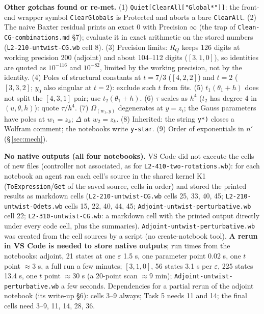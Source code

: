 \documentclass[10pt]{article}
\newcommand{\nb}[1]{\texttt{#1}}
\begin{document}
\textbf{Other gotchas found or re-met.} (1) \nb{Quiet[ClearAll["Global\textasciigrave{}*"]]}: the front-end wrapper symbol \nb{ClearGlobals} is Protected and aborts a bare \nb{ClearAll}. (2) The naive Baxter residual prints an exact 0 with Precision $\infty$ (the trap of \nb{Clean-\allowbreak{}CG-\allowbreak{}combinations.\allowbreak{}md} \S{}7); evaluate it in exact arithmetic on the stored numbers (\nb{L2-\allowbreak{}210-\allowbreak{}untwist-\allowbreak{}CG.\allowbreak{}wb} cell 8). (3) Precision limits: $R_Q$ keeps 126 digits at working precision 200 (adjoint) and about 104--112 digits ($[3,1,0]$), so identities are quoted as $10^{-116}$ and $10^{-82}$, limited by the working precision, not by the identity. (4) Poles of structural constants at $t=7/3$ ($[4,2,2]$) and $t=2$ ($[3,3,2]$; $y_0$ also singular at $t=2$): exclude such $t$ from fits. (5) $t_1(\theta_1+h)$ does not split the $[4,3,1]$ pair; use $t_2(\theta_1+h)$. (6) $\tau$ scales as $h^4$ ($t_2$ has degree 4 in $(u,\theta,h)$): quote $\tau/h^4$. (7) $\Omega_{(w_1,y)}$ degenerates at $y=z_i$; the Gauss parameters have poles at $w_1=z_k$; $\Delta$ at $w_2=z_k$. (8) Inherited: the string \nb{y*)} closes a Wolfram comment; the notebooks write \nb{y-\allowbreak{}star}. (9) Order of exponentials in $n'$ (\S\,\ref{sec:mech}).

\textbf{No native outputs (all four notebooks).} VS Code did not execute the cells of new files (controller not associated, as for \nb{L2-\allowbreak{}410-\allowbreak{}two-\allowbreak{}rotations.\allowbreak{}wb}): for each notebook an agent ran each cell's source in the shared kernel K1 (\nb{ToExpression}/\nb{Get} of the saved source, cells in order) and stored the printed results as markdown cells (\nb{L2-\allowbreak{}210-\allowbreak{}untwist-\allowbreak{}CG.\allowbreak{}wb} cells 25, 33, 40, 45; \nb{L2-\allowbreak{}210-\allowbreak{}untwist-\allowbreak{}Qdets.\allowbreak{}wb} cells 15, 22, 40, 44, 45; \nb{Adjoint-\allowbreak{}untwist-\allowbreak{}perturbative.\allowbreak{}wb} cell 22; \nb{L2-\allowbreak{}310-\allowbreak{}untwist-\allowbreak{}CG.\allowbreak{}wb}: a markdown cell with the printed output directly under every code cell, plus the summaries). \nb{Adjoint-\allowbreak{}untwist-\allowbreak{}perturbative.\allowbreak{}wb} was created from the cell sources by a script (no create-notebook tool). \textbf{A rerun in VS Code is needed to store native outputs}; run times from the notebooks: adjoint, 21 states at one $\varepsilon$ 1.5 s, one parameter point 0.02 s, one $t$ point $\approx3$ s, a full run a few minutes; $[3,1,0]$, 56 states 3.1 s per $\varepsilon$, 225 states 13.4 s, one $t$ point $\approx30$ s (a 20-point scan $\approx9$ min); \nb{Adjoint-\allowbreak{}untwist-\allowbreak{}perturbative.\allowbreak{}wb} a few seconds. Dependencies for a partial rerun of the adjoint notebook (its write-up \S{}6): cells 3--9 always; Task 5 needs 11 and 14; the final cells need 3--9, 11, 14, 28, 36.
\end{document}
